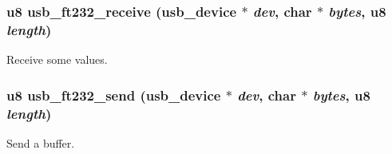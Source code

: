 \subsubsection{\setlength{\rightskip}{0pt plus 5cm}u8 usb\_\-ft232\_\-receive ({\bf usb\_\-device} $\ast$ {\em dev}, char $\ast$ {\em bytes}, u8 {\em length})}\label{ft232_8h_0cf7d193c90d165c74634239e8c9ecd4}


Receive some values. 
\subsubsection{\setlength{\rightskip}{0pt plus 5cm}u8 usb\_\-ft232\_\-send ({\bf usb\_\-device} $\ast$ {\em dev}, char $\ast$ {\em bytes}, u8 {\em length})}\label{ft232_8h_15b0b076a221679eb2360844e5a940e4}


Send a buffer. 